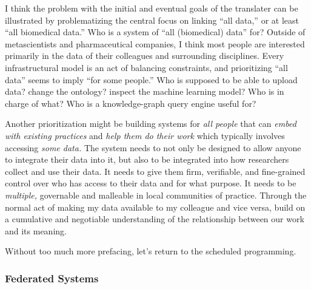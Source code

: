 \documentclass[11pt]{article}
\begin{document}
\begin{multicols}{2}
I think the problem with the initial and eventual goals of the
translater can be illustrated by problematizing the central focus on
linking ``all data,'' or at least ``all biomedical data.'' Who is a
system of ``all (biomedical) data'' for? Outside of metascientists and
pharmaceutical companies, I think most people are interested primarily
in the data of their colleagues and surrounding disciplines. Every
infrastructural model is an act of balancing constraints, and
prioritizing ``all data'' seems to imply ``for some people.'' Who is
supposed to be able to upload data? change the ontology? inspect the
machine learning model? Who is in charge of what? Who is a
knowledge-graph query engine useful for?

Another prioritization might be building systems for \emph{all people}
that can \emph{embed with existing practices} and \emph{help them do
their work} which typically involves accessing \emph{some data.} The
system needs to not only be designed to allow anyone to integrate their
data into it, but also to be integrated into how researchers collect and
use their data. It needs to give them firm, verifiable, and fine-grained
control over who has access to their data and for what purpose. It needs
to be \emph{multiple,} governable and malleable in local communities of
practice. Through the normal act of making my data available to my
colleague and vice versa, build on a cumulative and negotiable
understanding of the relationship between our work and its meaning.

Without too much more prefacing, let's return to the scheduled
programming. 
\end{multicols}


\hypertarget{federated-systems}{%
\subsubsection{Federated Systems}\label{federated-systems}}
\end{document}
